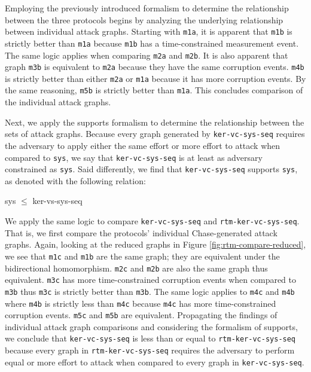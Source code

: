 \documentclass[runningheads]{llncs}
\theoremstyle{definition}
\begin{document}
Employing the previously introduced formalism to determine the relationship between the three protocols begins by analyzing the underlying relationship between individual attack graphs. Starting with \texttt{m1a}, it is apparent that \texttt{m1b} is strictly better than \texttt{m1a} because \texttt{m1b} has a time-constrained measurement event. The same logic applies when comparing \texttt{m2a} and \texttt{m2b}. It is also apparent that graph \texttt{m3b} is equivalent to \texttt{m2a} because they have the same corruption events. \texttt{m4b} is strictly better than either \texttt{m2a} or \texttt{m1a} because it has more corruption events. By the same reasoning, \texttt{m5b} is strictly better than \texttt{m1a}. This concludes comparison of the individual attack graphs.

Next, we apply the supports formalism to determine the relationship between the sets of attack graphs. Because every graph generated by \texttt{ker-vc-sys-seq} requires the adversary to apply either the same effort or more effort to attack when compared to \texttt{sys}, we say that \texttt{ker-vc-sys-seq} is at least as adversary constrained as \texttt{sys}. Said differently, we find that \texttt{ker-vc-sys-seq} supports \texttt{sys}, as denoted with the following relation: 

\begin{center}
    sys $\leq$ ker-vs-sys-seq
\end{center}

We apply the same logic to compare \texttt{ker-vc-sys-seq} and \texttt{rtm-ker-vc-sys-seq}. That is, we first compare the protocols' individual Chase-generated attack graphs. Again, looking at the reduced graphs in Figure \ref{fig:rtm-compare-reduced}, we see that  \texttt{m1c} and  \texttt{m1b} are the same graph; they are equivalent under the bidirectional homomorphism. \texttt{m2c} and \texttt{m2b} are also the same graph thus equivalent. \texttt{m3c} has more time-constrained corruption events when compared to  \texttt{m3b} thus  \texttt{m3c} is strictly better than \texttt{m3b}. The same logic applies to \texttt{m4c} and  \texttt{m4b} where  \texttt{m4b} is strictly less than  \texttt{m4c} because  \texttt{m4c} has more time-constrained corruption events.  \texttt{m5c} and \texttt{m5b} are equivalent. Propagating the findings of individual attack graph comparisons and considering the formalism of supports, we conclude that \texttt{ker-vc-sys-seq} is less than or equal to \texttt{rtm-ker-vc-sys-seq} because every graph in \texttt{rtm-ker-vc-sys-seq} requires the adversary to perform equal or more effort to attack when compared to every graph in  \texttt{ker-vc-sys-seq}. 
\end{document}
